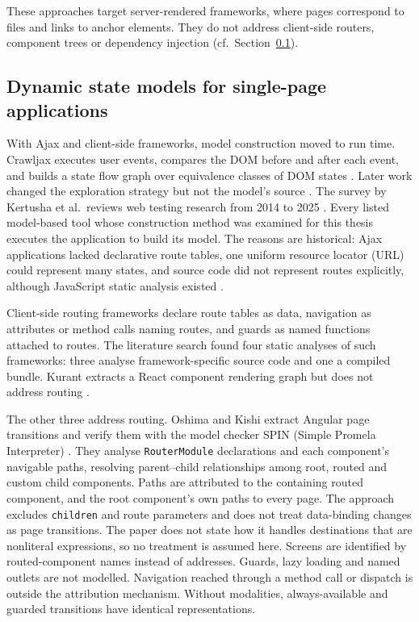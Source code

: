 These approaches target server-rendered frameworks, where pages correspond to files and links
to anchor elements. They do not address client-side routers, component trees or dependency
injection (cf.~Section~\ref{sec:dynamic-spa}).

\subsection{Dynamic state models for single-page applications}
\label{sec:dynamic-spa}

With Ajax and client-side frameworks, model construction moved to run time. Crawljax executes
user events, compares the DOM before and after each event, and builds a state flow graph over
equivalence classes of DOM states \cite{crawljax2012}. Later work changed the exploration
strategy but not the model's source
\cite{feedex2013,fraggen2022}. The survey by Kertusha et al.\
reviews web testing research from 2014 to 2025 \cite{websurvey2025}. Every listed model-based
tool whose construction method was examined for this thesis executes the application to build
its model. The reasons are historical: Ajax applications lacked declarative route tables,
one uniform resource locator (URL) could represent many states, and source code did not
represent routes explicitly, although JavaScript static analysis existed \cite{jensen2009type}.

Client-side routing frameworks declare route tables as data, navigation as attributes or
method calls naming routes, and guards as named functions attached to routes. The literature
search found four static analyses of such frameworks: three analyse framework-specific source
code and one a compiled bundle. Kurant extracts a React component rendering graph but does not
address routing \cite{kurant2025}.

The other three address routing. Oshima and Kishi extract Angular page transitions and verify
them with the model checker SPIN (Simple Promela Interpreter) \cite{oshima2018model}. They analyse \texttt{RouterModule} declarations
and each component's navigable paths, resolving parent--child relationships among root, routed
and custom child components. Paths are attributed to the containing routed component, and the
root component's own paths to every page. The approach excludes \texttt{children} and route parameters
and does not treat data-binding changes as page transitions. The paper does not state how it
handles destinations that are nonliteral expressions, so no treatment is assumed here. Screens are
identified by routed-component names instead of addresses. Guards, lazy loading and named outlets
are not modelled. Navigation reached through a method call or dispatch is outside the
attribution mechanism. Without modalities, always-available and guarded transitions have
identical representations.

